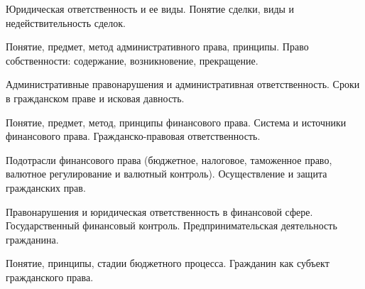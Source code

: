 \documentclass[
	14pt,
	a4paper,
	]
	{scrartcl}
\begin{document}
\vfill

\newpage


\shapk
{}
\setcounter{zad}{0}

\vfill
\z Юридическая ответственность и ее виды.
 \vfill
\z Понятие сделки, виды и недействительность сделок.
 \vfill

\vfill

\newpage


\shapk
{}
\setcounter{zad}{0}

\vfill
\z Понятие, предмет, метод административного права, принципы.
 \vfill
\z Право собственности: содержание, возникновение, прекращение.
 \vfill

\vfill

\newpage


\shapk
{}
\setcounter{zad}{0}

\vfill
\z Административные правонарушения и административная ответственность.
 \vfill
\z Сроки в гражданском праве и исковая давность.
 \vfill

\vfill

\newpage


\shapk
{}
\setcounter{zad}{0}

\vfill
\z Понятие, предмет, метод, принципы финансового права. Система и источники финансового права.
 \vfill
\z Гражданско-правовая ответственность.
 \vfill

\vfill

\newpage


\shapk
{}
\setcounter{zad}{0}

\vfill
\z Подотрасли финансового права (бюджетное, налоговое, таможенное право, валютное регулирование и валютный контроль).
 \vfill
\z Осуществление и защита гражданских прав. 
 \vfill

\vfill

\newpage


\shapk
{}
\setcounter{zad}{0}

\vfill
\z Правонарушения и юридическая ответственность в финансовой сфере. Государственный финансовый контроль.
 \vfill
\z Предпринимательская деятельность гражданина.
 \vfill

\vfill

\newpage


\shapk
{}
\setcounter{zad}{0}

\vfill
\z Понятие, принципы, стадии бюджетного процесса.
 \vfill
\z Гражданин как субъект гражданского права. 
 \vfill
\end{document}
